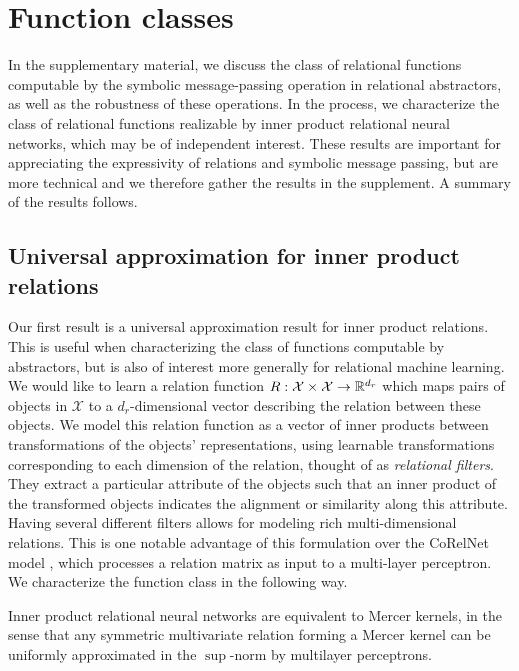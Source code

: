 \section{Function classes}
\label{ssec:function_classes_preview}

In the supplementary material, we discuss the class of relational functions computable by the symbolic message-passing operation in relational abstractors, as well as the robustness of these operations. In the process, we characterize the class of relational functions realizable by inner product relational neural networks, which may be of independent interest. These results are important for appreciating the expressivity of relations and symbolic message passing, but are more technical and we therefore gather the results in the supplement. A summary of the results follows.


\def\rdot{\bigcdot}
\def\F{{\mathfrak{F}}}
\def\MLP{\text{MLP}}

\subsection{Universal approximation for inner product relations}

Our first result is a universal approximation result for inner product relations. This is useful when characterizing the class of functions computable by abstractors, but is also of interest more generally for relational machine learning.
We would like to learn a relation function \(R: \mathcal{X} \times \mathcal{X} \to \mathbb{R}^{d_r}\) which maps pairs of objects in \(\mathcal{X}\) to a \(d_r\)-dimensional vector describing the relation between these objects. We model this relation function as a vector of inner products between transformations of the objects' representations,
using learnable transformations corresponding to each dimension of the relation, thought of as \textit{relational filters}. They extract a particular attribute of the objects such that an inner product of the transformed objects indicates the alignment or similarity along this attribute. Having several different filters allows for modeling rich multi-dimensional relations. This is one notable advantage of this formulation over the CoRelNet model \citep{kerg2022neural}, which processes a relation matrix as input to a multi-layer perceptron. We characterize the function class in the following way.

\begin{result}
    Inner product relational neural networks are equivalent to Mercer kernels, in the 
    sense that any symmetric multivariate relation forming a Mercer kernel can be 
    uniformly approximated in the $\sup$-norm by multilayer perceptrons.
\end{result}

